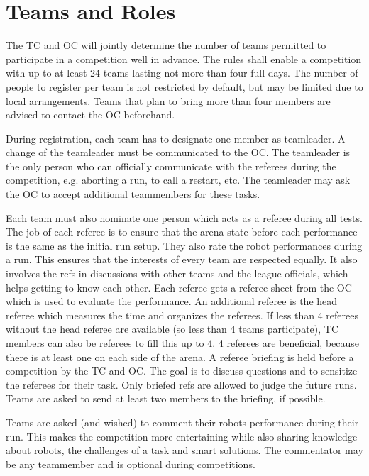 \label{sec:Competition}

\section{Teams and Roles}
\label{sec: teams and roles}

The TC and OC will jointly determine the number of teams permitted to participate in a competition well in advance. The rules shall enable a competition with up to at least 24 teams lasting not more than four full days. The number of people to register per team is not restricted by default, but may be limited due to local arrangements. Teams that plan to bring more than four members are advised to contact the OC beforehand.

During registration, each team has to designate one member as teamleader. A change of the teamleader must be communicated to the OC. 
The teamleader is the only person who can officially communicate with the referees during the competition, e.g. aborting a run, to call a restart, etc. 
The teamleader may ask the OC to accept additional teammembers for these tasks.

Each team must also nominate one person which acts as a referee during all tests.
The job of each referee is to ensure that the arena state before each performance is the same as the initial run setup.
They also rate the robot performances during a run. 
This ensures that the interests of every team are respected equally.
It also involves the refs in discussions with other teams and the league officials,
which helps getting to know each other.
Each referee gets a referee sheet from the OC which is used to evaluate the performance. An additional referee is the head referee which measures the time and organizes the referees. If less than 4 referees without the head referee are available (so less than 4 teams participate), TC members can also be referees to fill this up to 4. 4 referees are beneficial, because there is at least one on each side of the arena. A referee briefing is held before a competition by the TC and OC. The goal is to discuss questions and to sensitize the referees for their task. Only briefed refs are allowed to judge the future runs. Teams are asked to send at least two members to the briefing, if possible.

Teams are asked (and wished) to comment their robots performance during their run.
This makes the competition more entertaining while also sharing knowledge about robots, 
the challenges of a task and smart solutions.
The commentator may be any teammember and is optional during competitions.

